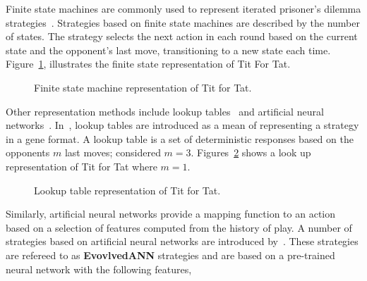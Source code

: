 \documentclass{article}
\begin{document}
Finite state machines are commonly used to represent iterated prisoner's
dilemma strategies~\cite{Miller1996, Rubinstein1986}. Strategies based on
finite state machines are described by the number of states.
The strategy selects the next action in each round based on the current state
and the opponent's last move, transitioning to a new state each time. Figure~\ref{fig:tit_for_tat_fsm},
illustrates the finite state representation of Tit For Tat.

\begin{figure}[!hbtp]
    \centering
    
    \caption{Finite state machine representation of Tit for Tat.}
    \label{fig:tit_for_tat_fsm}
\end{figure}

Other representation methods include lookup tables~\cite{Axelrod1987, Lindgren1994}
and artificial neural networks~\cite{Fogel1996, Lee2015}. In~\cite{Axelrod1987},
lookup tables are introduced as a mean of representing a strategy in a gene 
format. A lookup table is a set of deterministic responses based on the
opponents \(m\) last moves; \cite{Axelrod1987} considered \(m=3\).
Figures~\ref{fig:tit_for_tat_lu} shows a look up representation of Tit for Tat
where \(m=1\).

\begin{figure}[!hbtp]
    \centering
    
    \caption{Lookup table representation of Tit for Tat.}
    \label{fig:tit_for_tat_lu}
\end{figure}

Similarly, artificial neural networks provide a mapping function to an action
based on a selection of features computed from the history of play. A number 
of strategies based on artificial neural networks are introduced by~\cite{Knight2017}.
These strategies are refereed to as \textbf{EvovlvedANN} strategies and are
based on a pre-trained neural network with the following features,
\end{document}
